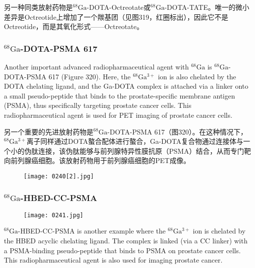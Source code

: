 \documentclass[dvipsnames, svgnames,a4paper,11pt]{article}
\begin{document}
另一种同类放射药物是\(\mathrm{^{68}Ga}\)-DOTA-Octreotate或\(\mathrm{^{68}Ga}\)-DOTA-TATE。唯一的微小差异是Octreotide上增加了一个羰基团（见图319，红圈标出），因此它不是Octreotide，而是其氧化形式——Octreotate。



\subsubsection{\(\mathrm{^{68}Ga}\)-DOTA-PSMA 617}  
Another important advanced radiopharmaceutical agent with \(\mathrm{^{68}Ga}\) is \(\mathrm{^{68}Ga}\)-DOTA-PSMA 617 (Figure 320). Here, the \(\mathrm{^{68}Ga^{3+}}\) ion is also chelated by the DOTA chelating ligand, and the Ga-DOTA complex is attached via a linker onto a small pseudo-peptide that binds to the prostate-specific membrane antigen (PSMA), thus specifically targeting prostate cancer cells. This radiopharmaceutical agent is used for PET imaging of prostate cancer cells.

另一个重要的先进放射药物是\(\mathrm{^{68}Ga}\)-DOTA-PSMA 617（图320）。在这种情况下，\(\mathrm{^{68}Ga^{3+}}\)离子同样通过DOTA螯合配体进行螯合，Ga-DOTA复合物通过连接体与一个小的伪肽连接，该伪肽能够与前列腺特异性膜抗原（PSMA）结合，从而专门靶向前列腺癌细胞。该放射药物用于前列腺癌细胞的PET成像。

\begin{figure}[h]
	\centering
    \texttt{[image: 0240[2].jpg]}  
     \label{fig320}
\end{figure}

\subsubsection{\(\mathrm{^{68}Ga}\)-HBED-CC-PSMA}  

\begin{figure}[h]
	\centering
    \texttt{[image: 0241.jpg]}  
     \label{fig321}
\end{figure}

\(\mathrm{^{68}Ga}\)-HBED-CC-PSMA is another example where the \(\mathrm{^{68}Ga^{3+}}\) ion is chelated by the HBED acyclic chelating ligand. The complex is linked (via a CC linker) with a PSMA-binding pseudo-peptide that binds to PSMA on prostate cancer cells. This radiopharmaceutical agent is also used for imaging prostate cancer.
\end{document}
